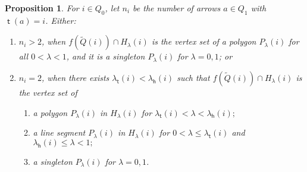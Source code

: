 \documentclass[11pt,a4paper]{amsart}
\numberwithin{equation}{section}
\newtheorem{proposition}[theorem]{Proposition}
\theoremstyle{definition}
\theoremstyle{remark}
\newcommand{\one}{\ensuremath{(\mathrm{i})}}
\newcommand{\two}{\ensuremath{(\mathrm{ii})}}
\newcommand{\head}{\operatorname{\mathsf{h}}}
\newcommand{\tail}{\operatorname{\mathsf{t}}}
\begin{document}
\begin{proposition}
\label{prop:3cellpolygons}
For $i\in Q_0$, let $n_i$ be the number of arrows $a\in Q_1$ with $\tail(a)=i$. Either:
\begin{enumerate}
\item[\one] $n_i > 2$, when $f(\widetilde{Q}(i))\cap H_\lambda(i)$ is the vertex set of a polygon $P_\lambda(i)$ for all $0< \lambda < 1$, and it is a singleton $P_\lambda(i)$ for $\lambda =0,1$; or
\item[\two] $n_i=2$, when there exists $\lambda_{\tail}(i)< \lambda_{\head}(i)$ such that $f(\widetilde{Q}(i))\cap H_\lambda(i)$ is the vertex set of
\begin{enumerate}
\item a polygon $P_\lambda(i)$ in $H_\lambda(i)$ for $\lambda_{\tail}(i)< \lambda < \lambda_{\head}(i);$
\item a line segment $P_{\lambda}(i)$ in $H_\lambda(i)$ for $0<\lambda\leq \lambda_{\tail}(i)$ and $\lambda_{\head}(i)\leq \lambda< 1;$
\item a singleton $P_\lambda(i)$ for $\lambda =0,1$.
\end{enumerate}
\end{enumerate}
\end{proposition}
\end{document}
